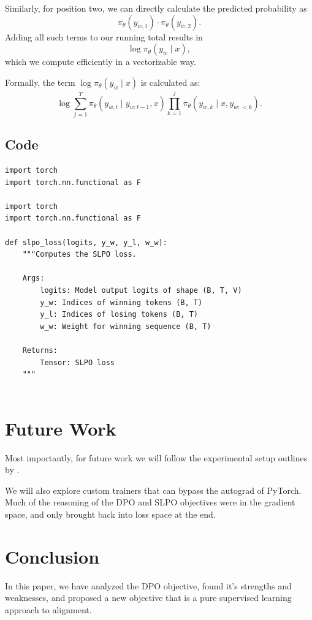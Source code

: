 \documentclass[twoside,11pt]{article}
\begin{document}
Similarly, for position 
two, we can directly calculate the predicted probability as 
\[
\pi_\theta(y_{w, 1}) \cdot \pi_\theta(y_{\overline{w}, 2}).
\]
Adding all such terms to our running total results in 
\[
\log \pi_\theta(y_{\overline{w}} \mid x),
\]
which we compute efficiently in a vectorizable way. 

Formally, the term \(\log \pi_\theta(y_{\overline{w}} \mid x)\) is calculated as:
\[
\log 
\sum_{j=1}^{T} 
  \pi_\theta(y_{\overline{w},t} \mid y_{w:t-1}, x)
\prod_{k=1}^{j} 
  \pi_\theta(y_{w,k} \mid x, y_{w:<k}).
\]


\subsection{Code}

\begin{verbatim}
import torch
import torch.nn.functional as F

import torch
import torch.nn.functional as F

def slpo_loss(logits, y_w, y_l, w_w):
    """Computes the SLPO loss.

    Args:
        logits: Model output logits of shape (B, T, V)
        y_w: Indices of winning tokens (B, T)
        y_l: Indices of losing tokens (B, T)
        w_w: Weight for winning sequence (B, T)
    
    Returns:
        Tensor: SLPO loss
    """
    
\end{verbatim}

\section{Future Work}

Most importantly, for future work we will follow the
experimental setup outlines by \cite{Rafailov}.

We will also explore custom trainers that can bypass the autograd
of PyTorch. Much of the reasoning of the DPO and SLPO objectives
were in the gradient space, and only brought back into loss
space at the end. 

\section{Conclusion}

In this paper, we have analyzed the DPO objective, found 
it's strengths and weaknesses, and proposed a new objective
that is a pure supervised learning approach to alignment.
\end{document}
